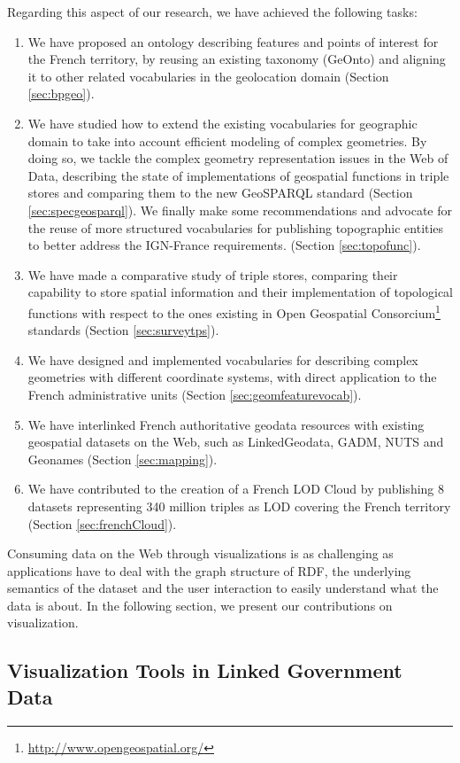 Regarding this aspect of our research, we have achieved the following tasks:
\begin{enumerate}
 \item We have proposed an ontology describing features and points of interest for the French territory, by reusing an existing taxonomy (GeOnto) and aligning it to other related vocabularies in the geolocation domain (Section \ref{sec:bpgeo}).
 \item  We have studied how to extend the existing vocabularies for geographic domain to take into account efficient modeling of complex geometries. By doing so, we tackle the complex geometry representation issues in the Web of Data, describing the state of implementations of geospatial functions in triple stores and comparing them to the new GeoSPARQL standard (Section \ref{sec:specgeosparql}).  We finally make some recommendations and advocate for the reuse of more structured vocabularies for publishing topographic entities to better address the IGN-France requirements. (Section \ref{sec:topofunc}).
 \item We have made a comparative study of triple stores, comparing their capability to store spatial information and their implementation of topological functions with respect to the ones existing in Open Geospatial Consorcium\footnote{\url{http://www.opengeospatial.org/}} standards (Section \ref{sec:surveytps}).
 \item  We have designed and implemented vocabularies for describing complex geometries with different coordinate systems, with direct application to the French administrative units (Section \ref{sec:geomfeaturevocab}).
 \item We have interlinked French authoritative geodata resources with existing geospatial datasets on the Web, such as LinkedGeodata, GADM, NUTS and Geonames (Section \ref{sec:mapping}).
 \item We have contributed to the creation of a French LOD Cloud by publishing 8 datasets representing 340 million triples as LOD covering the French territory (Section \ref{sec:frenchCloud}).
\end{enumerate}

Consuming data on the Web through visualizations is as challenging as applications have to deal with the graph structure of RDF, the underlying semantics of the dataset and the user interaction to easily understand what the data is about. In the following section, we present our contributions on visualization.
\subsection{Visualization Tools in Linked Government Data} \label{visu}

